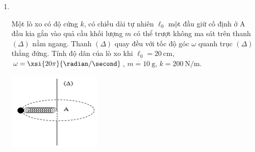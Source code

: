\begin{enumerate}[label=\bfseries Câu \arabic*:, leftmargin=1.5cm]
\item {}\\
{Một lò xo có độ cứng $k$, có chiều dài tự nhiên $\ell_0$ một đầu giữ cố định ở A đầu kia gắn vào quả cầu khối lượng $m$ có thể trượt không ma sát trên thanh $\left(\Delta\right)$ nằm ngang. Thanh $\left(\Delta\right)$ quay đều với tốc độ góc $\omega$ quanh trục $\left(\Delta\right)$ thẳng đứng. Tính độ dãn của lò xo khi $\ell_0 =\SI{20}{\centi\meter}$, $\omega=\xsi{20\pi}{\radian/\second}$, $m =\SI{10}{\gram}$, $k =\SI{200}{\newton/\meter}$.
	\begin{center}
		\includegraphics[width=0.3\linewidth]{../figs/VN10-2023-PH-TP033-3}
	\end{center}
}
\end{enumerate}

